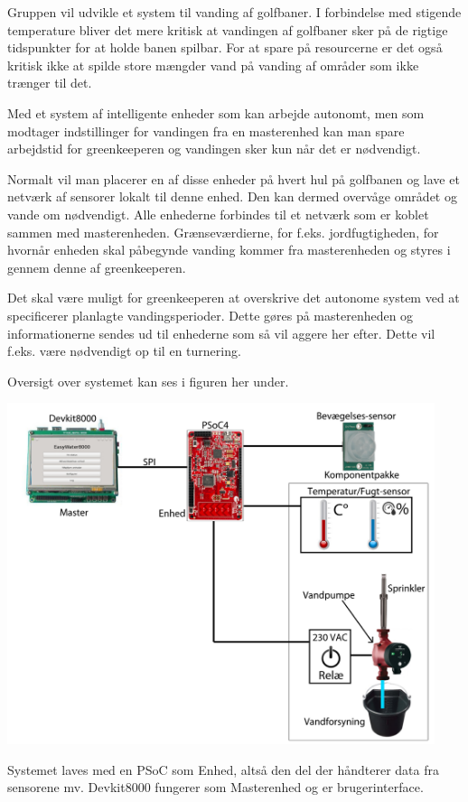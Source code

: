 

Gruppen vil udvikle et system til vanding af golfbaner. I forbindelse med stigende temperature bliver det mere kritisk at vandingen af golfbaner sker på de rigtige tidspunkter for at holde banen spilbar. For at spare på resourcerne er det også kritisk ikke at spilde store mængder vand på vanding af områder som ikke trænger til det.

Med et system af intelligente enheder som kan arbejde autonomt, men som modtager indstillinger for vandingen fra en masterenhed kan man spare arbejdstid for greenkeeperen og vandingen sker kun når det er nødvendigt.

Normalt vil man placerer en af disse enheder på hvert hul på golfbanen og lave et netværk af sensorer lokalt til denne enhed. Den kan dermed overvåge området og vande om nødvendigt. Alle enhederne forbindes til et netværk som er koblet sammen med masterenheden. Grænseværdierne, for f.eks. jordfugtigheden, for hvornår enheden skal påbegynde vanding kommer fra masterenheden og styres i gennem denne af greenkeeperen.

Det skal være muligt for greenkeeperen at overskrive det autonome system ved at specificerer planlagte vandingsperioder. Dette gøres på masterenheden og informationerne sendes ud til enhederne som så vil aggere her efter. Dette vil f.eks. være nødvendigt op til en turnering.

Oversigt over systemet kan ses i figuren her under.

{\includegraphics[height=10cm]{filer/indledning/billeder/vandingssystem}} 

Systemet laves med en PSoC som Enhed, altså den del der håndterer data fra sensorene mv.
Devkit8000 fungerer som Masterenhed og er brugerinterface.

